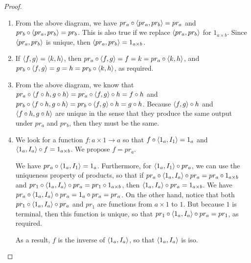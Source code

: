\begin{proof}
 \begin{enumerate}
     \item From the above diagram, we have $pr_a\circ\left\langle pr_a,pr_b\right\rangle=pr_a$ and $pr_b\circ\left\langle pr_a,pr_b\right\rangle=pr_b$. This is also true if we replace $\left\langle pr_a,pr_b\right\rangle$ for $1_{a\times b}$. Since $\left\langle pr_a,pr_b\right\rangle$ is unique, then $\left\langle pr_a,pr_b\right\rangle= 1_{a\times b}$.
     \item If $\left\langle f,g\right\rangle=\left\langle k,h\right\rangle$, then $pr_a\circ\left\langle f,g\right\rangle=f=k=pr_a\circ\left\langle k,h\right\rangle$, and $pr_b\circ\left\langle f,g\right\rangle=g=h=pr_b\circ\left\langle k,h\right\rangle$, as required.
     \item From the above diagram, we know that $pr_a\circ\left\langle f\circ h, g\circ h\right\rangle=pr_a\circ\left\langle f, g\right\rangle\circ h= f\circ h$ and $pr_b\circ\left\langle f\circ h, g\circ h\right\rangle=pr_b\circ\left\langle f, g\right\rangle\circ h= g\circ h$. Because $\left\langle f,g\right\rangle\circ h$ and $\left\langle f\circ h, g\circ h\right\rangle$ are unique in the sense that they produce the same output under $pr_a$ and $pr_b$, then they must be the same.
     \item We look for a function $f:a\times 1\rightarrow a$ so that $f\circ\left\langle 1_a,I_1\right\rangle=1_a$ and $\left\langle 1_a,I_a\right\rangle\circ f=1_{a\times b}$. We propose $f=pr_a$.

     We have $pr_a\circ\left\langle 1_a,I_1\right\rangle=1_a$. Furthermore, for $\left\langle 1_a,I_1\right\rangle\circ pr_a$, we can use the uniqueness property of products, so that if $pr_a\circ\left\langle 1_a,I_a\right\rangle\circ pr_a = pr_a\circ 1_{a\times b}$ and  $pr_1\circ\left\langle 1_a,I_a\right\rangle\circ pr_a = pr_1\circ 1_{a\times b}$, then $\left\langle 1_a,I_a\right\rangle\circ pr_a=1_{a\times b}$. We have $pr_a\circ\left\langle 1_a,I_a\right\rangle\circ pr_a = 1_a\circ pr_a=pr_a$. On the other hand, notice that both $pr_1\circ\left\langle 1_a,I_a\right\rangle\circ pr_a$ and $pr_1$ are functions from $a\times 1$ to $1$. But because $1$ is terminal, then this function is unique, so that $pr_1\circ\left\langle 1_a,I_a\right\rangle\circ pr_a = pr_1$, as required.

     As a result, $f$ is the inverse of $\left\langle 1_a,I_a\right\rangle$, so that $\left\langle 1_a,I_a\right\rangle$ is iso.
 \end{enumerate}
\end{proof}